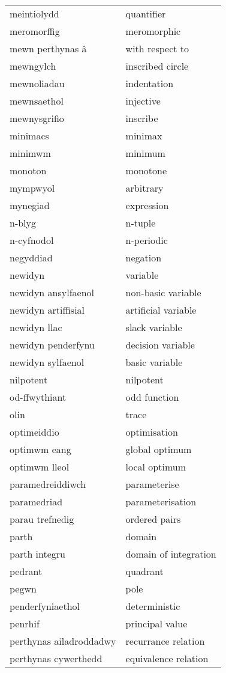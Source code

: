 \begin{supertabular}{p{0.22\textwidth}p{0.22\textwidth}}
meintiolydd & quantifier \\
meromorffig & meromorphic \\
mewn perthynas â & with respect to \\
mewngylch & inscribed circle \\
mewnoliadau & indentation \\
mewnsaethol & injective \\
mewnysgrifio & inscribe \\
minimacs & minimax \\
minimwm & minimum \\
monoton & monotone \\
mympwyol & arbitrary \\
mynegiad & expression \\
n-blyg & n-tuple \\
n-cyfnodol & n-periodic \\
negyddiad & negation \\
newidyn & variable \\
newidyn ansylfaenol & non-basic variable \\
newidyn artiffisial & artificial variable \\
newidyn llac & slack variable \\
newidyn penderfynu & decision variable \\
newidyn sylfaenol & basic variable \\
nilpotent & nilpotent \\
od-ffwythiant & odd function \\
olin & trace \\
optimeiddio & optimisation \\
optimwm eang & global optimum \\
optimwm lleol & local optimum \\
paramedreiddiwch & parameterise \\
paramedriad & parameterisation \\
parau trefnedig & ordered pairs \\
parth & domain \\
parth integru & domain of integration \\
pedrant & quadrant \\
pegwn & pole \\
penderfyniaethol & deterministic \\
penrhif & principal value \\
perthynas ailadroddadwy & recurrance relation \\
perthynas cywerthedd & equivalence relation \\

\end{supertabular}
